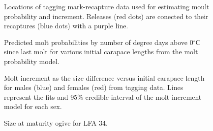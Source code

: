 \documentclass[11pt]{article}
\newcommand{\e}{\string~/bio.data/bio.lobster/figures/LFA3438Framework2019/figures/} %
\begin{document}
    \begin{figure}
    \centering
        \caption{Locations of tagging mark-recapture data used for estimating moult probability and increment. Releases (red dots) are conected to their recaptures (blue dots) with a purple line.}

    \end{figure}

    \begin{figure}
    \centering
        \caption{Predicted molt probabilities by number of degree days above 0$^{\circ}$C since last molt for various initial carapace lengths from the molt probability model.}

    \end{figure}

    \begin{figure}
    \centering
        \caption{Molt increment as the size difference versus initial carapace length for males (blue) and females (red) from tagging data. Lines represent the fits and 95\% credible interval of the molt increment model for each sex.}

    \end{figure}    


    \begin{figure}
    \centering
        \caption{Size at maturity ogive for LFA 34.}

    \end{figure}    


    
\end{document}

